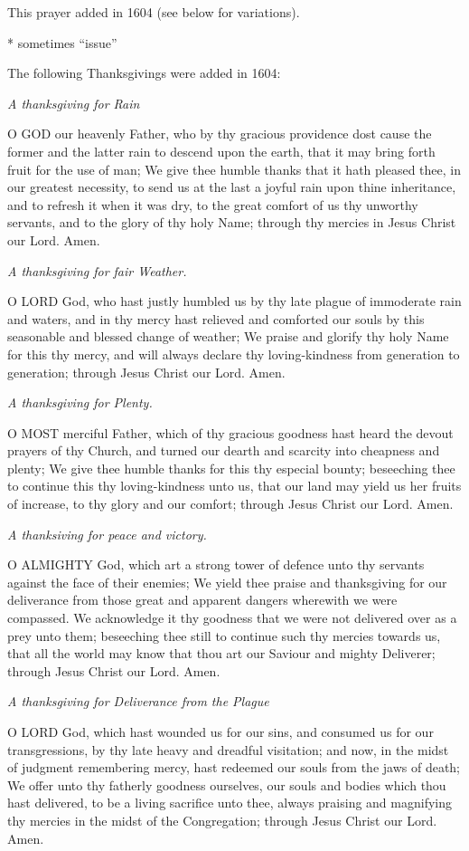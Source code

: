 This
prayer added in 1604 (see below for variations).

*
sometimes ``issue''

The
following Thanksgivings were added in 1604:

\emph{A
thanksgiving for Rain}

O
GOD our heavenly Father, who by thy gracious providence dost cause the
former and the latter rain to descend upon the earth, that it may bring
forth fruit for the use of man; We give thee humble thanks that it hath
pleased thee, in our greatest necessity, to send us at the last a joyful
rain upon thine inheritance, and to refresh it when it was dry, to the
great comfort of us thy unworthy servants, and to the glory of thy holy
Name; through thy mercies in Jesus Christ our Lord. Amen.

\emph{A thanksgiving for fair Weather.}

O
LORD God, who hast justly humbled us by thy late plague of immoderate
rain and waters, and in thy mercy hast relieved and comforted our souls
by this seasonable and blessed change of weather; We praise and glorify
thy holy Name for this thy mercy, and will always declare thy loving-kindness
from generation to generation; through Jesus Christ our Lord. Amen.

\emph{A thanksgiving for Plenty.}

O
MOST merciful Father, which of thy gracious goodness hast heard the devout
prayers of thy Church, and turned our dearth and scarcity into cheapness
and plenty; We give thee humble thanks for this thy especial bounty; beseeching
thee to continue this thy loving-kindness unto us, that our land may yield
us her fruits of increase, to thy glory and our comfort; through Jesus
Christ our Lord. Amen.

\emph{A thanksiving for peace and victory.}

O
ALMIGHTY God, which art a strong tower of defence unto thy servants against
the face of their enemies; We yield thee praise and thanksgiving for our
deliverance from those great and apparent dangers wherewith we were compassed.
We acknowledge it thy goodness that we were not delivered over as a prey
unto them; beseeching thee still to continue such thy mercies towards
us, that all the world may know that thou art our Saviour and mighty Deliverer;
through Jesus Christ our Lord. Amen.

\emph{A thanksgiving for Deliverance from the Plague}

O
LORD God, which hast wounded us for our sins, and consumed us for our
transgressions, by thy late heavy and dreadful visitation; and now, in
the midst of judgment remembering mercy, hast redeemed our souls from
the jaws of death; We offer unto thy fatherly goodness ourselves, our
souls and bodies which thou hast delivered, to be a living sacrifice unto
thee, always praising and magnifying thy mercies in the midst of the Congregation;
through Jesus Christ our Lord. Amen.

